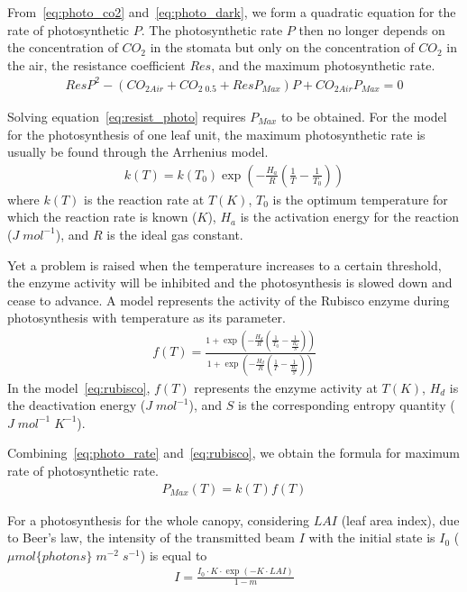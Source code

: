 \documentclass[a4paper]{article}
\begin{document}
From~\eqref{eq:photo_co2} and~\eqref{eq:photo_dark}, we form a quadratic equation for the rate of photosynthetic \(P\). The photosynthetic rate \(P\) then no longer depends on the concentration of \(CO_2\) in the stomata but only on the concentration of \(CO_2\) in the air, the resistance coefficient \(Res\), and the maximum photosynthetic rate.
\begin{align}
  \label{eq:resist_photo}
  ResP^2 - (CO_{2Air} + CO_{2\;0.5} + ResP_{Max})P + CO_{2Air}P_{Max} = 0
\end{align}

Solving equation~\eqref{eq:resist_photo} requires \(P_{Max}\) to be obtained. For the model for the photosynthesis of one leaf unit, the maximum photosynthetic rate is usually be found through the Arrhenius model.
\begin{align}
  \label{eq:photo_rate}
  k(T) = k(T_0)\exp \left(-\frac{H_a}{R} \left(\frac{1}{T} - \frac{1}{T_0}\right)\right)
\end{align}
where \(k(T)\) is the reaction rate at \(T(K)\), \(T_0\) is the optimum temperature for which the reaction
rate is known (\(K\)), \(H_a\) is the activation energy for the reaction (\(J\;mol^{-1}\)), and \(R\) is the ideal gas constant.

Yet a problem is raised when the temperature increases to a certain threshold, the enzyme activity will be inhibited and the photosynthesis is slowed down and cease to advance. A model represents the activity of the Rubisco enzyme during photosynthesis with temperature as its parameter.
\begin{align}
  \label{eq:rubisco}
  f(T) = \frac{1 + \exp \left(-\frac{H_d}{R} \left(\frac{1}{T_0} - \frac{1}{\frac{H_d}{S}}\right)\right)}{1 + \exp \left(-\frac{H_d}{R}\left(\frac{1}{T} - \frac{1}{\frac{H_d}{S}}\right)\right)}
\end{align}
In the model~\eqref{eq:rubisco}, \(f(T)\) represents the enzyme activity at \(T(K)\), \(H_d\) is the deactivation energy (\(J\;mol^{-1}\)), and \(S\) is the corresponding entropy quantity (\(J\;mol^{-1}\;K^{-1}\)).

Combining~\eqref{eq:photo_rate} and~\eqref{eq:rubisco}, we obtain the formula for maximum rate of photosynthetic rate.
\begin{align}
  \label{eq:photo_max}
  P_{Max}(T) = k(T)f(T)
\end{align}

For a photosynthesis for the whole canopy, considering \(LAI\) (leaf area index), due to Beer's law, the intensity of the transmitted beam \(I\) with the initial state is \(I_0\) (\(\mu mol\{photons\}\;m^{-2}\;s^{-1}\)) is equal to
\begin{align}
  I = \frac{I_0 \cdot K \cdot \exp \left(-K \cdot LAI\right)}{1 - m}
\end{align}
\end{document}
